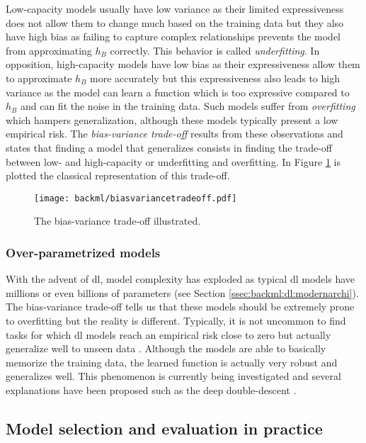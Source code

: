 Low-capacity models usually have low variance as their limited expressiveness does
not allow them to change much based on the training data but they also have high
bias as failing to capture complex relationships prevents the model from approximating
$h_B$ correctly. This behavior is called \textit{underfitting}. In opposition,
high-capacity models have low bias as their expressiveness allow them to approximate
$h_B$ more accurately but this expressiveness also leads to high variance as the
model can learn a function which is too expressive compared to $h_B$ and can fit
the noise in the training data. Such models suffer from \textit{overfitting} which
hampers generalization, although these models typically present a low empirical
risk. The \textit{bias-variance trade-off} results from these observations and
states that finding a model that generalizes consists in finding the trade-off
between low- and high-capacity or underfitting and overfitting. In Figure
\ref{fig:backml:biasvariancetradeoff} is plotted the classical representation of
this trade-off.

\begin{figure}
  \centering
  \texttt{[image: backml/biasvariancetradeoff.pdf]}
  \caption{The bias-variance trade-off illustrated.}
  \label{fig:backml:biasvariancetradeoff}
\end{figure}

\subsubsection{Over-parametrized models}

With the advent of \acrlong{dl}, model complexity has exploded as typical \acrlong{dl}
models have millions or even billions of parameters (see Section
\ref{ssec:backml:dl:modernarchi}). The bias-variance trade-off tells us that these
models should be extremely prone to overfitting but the reality is different.
Typically, it is not uncommon to find tasks for which \acrlong{dl} models reach
an empirical risk close to zero but actually generalize well to unseen data
\cite{zhang2021understanding}. Although the models are able to basically
memorize the training data, the learned function is actually very robust and
generalizes well. This phenomenon is currently being investigated and several
explanations have been proposed such as the deep double-descent
\cite{belkin2019reconciling}.

\subsection{Model selection and evaluation in practice}
\label{ssec:backml:modelselinpractice}

